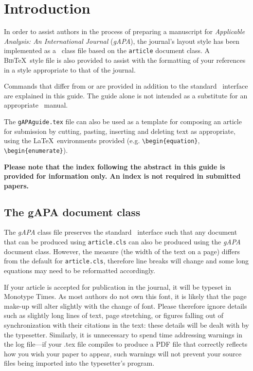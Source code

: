 \documentclass{gAPA2e}
\theoremstyle{plain}
\theoremstyle{remark}
\theoremstyle{definition}
\begin{document}
\section{Introduction}

In order to assist authors in the process of preparing a manuscript for \textit{Applicable Analysis: An International Journal} ({\it gAPA}), the journal's layout style has been implemented as a \LaTeXe\ class file based on the {\tt article} document class. A \textsc{Bib}\TeX\ style file is also provided to assist with the formatting of your references in a style appropriate to that of the journal.

Commands that differ from or are provided in addition to the standard \LaTeXe\ interface are explained in this guide. The guide alone is not intended as a substitute for an appropriate \LaTeXe\ manual.

The \texttt{gAPAguide.tex} file can also be used as a template for composing an article for submission by cutting, pasting, inserting and
deleting text as appropriate, using the \LaTeX\ environments provided (e.g. \verb"\begin{equation}", \verb"\begin{enumerate}").

{\bf{Please note that the index following the abstract in this guide is provided for information only. An index is not required in submitted papers.}}


\subsection{The {\bi gAPA} document class}\label{S1.1}

The \textit{gAPA} class file preserves the standard \LaTeXe\ interface such that any document that can
be produced using {\tt article.cls} can also be produced using the {\it gAPA} document class.
However, the measure (the width of the text on a page) differs from the default for {\tt article.cls}, therefore line breaks
will change and some long equations may need to be reformatted accordingly.

If your article is accepted for publication in the journal, it will be typeset in Monotype Times. As most authors do not own this font, it is likely that the page make-up will alter slightly with the change of font. Please therefore ignore details such as slightly long lines of text, page stretching, or figures falling out of synchronization with their citations in the text: these details will be dealt with by the typesetter. Similarly, it is unnecessary to spend time addressing warnings in the log file---if your .tex file compiles to produce a PDF file that correctly reflects how you wish your paper to appear, such warnings will not prevent your source files being imported into the typesetter's program.
\end{document}
